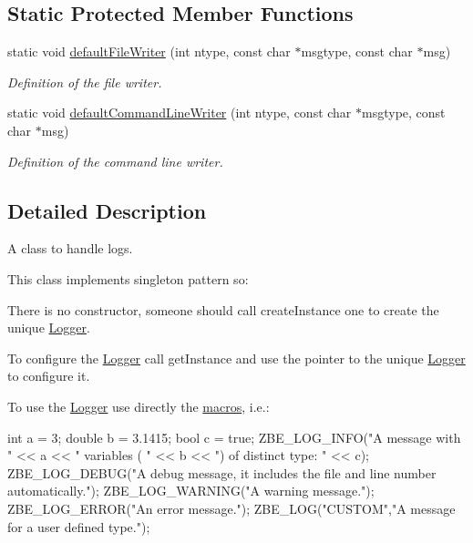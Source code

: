 \subsection*{Static Protected Member Functions}
\begin{DoxyCompactItemize}
\item 
static void \hyperlink{classzbe_1_1_logger_ac372e274976a42dd44d2109a6985b8d3}{default\+File\+Writer} (int ntype, const char $\ast$msgtype, const char $\ast$msg)
\begin{DoxyCompactList}\small\item\em Definition of the file writer. \end{DoxyCompactList}\item 
static void \hyperlink{classzbe_1_1_logger_a3e0850e34cc6abec6ffc5f4b08043d4a}{default\+Command\+Line\+Writer} (int ntype, const char $\ast$msgtype, const char $\ast$msg)
\begin{DoxyCompactList}\small\item\em Definition of the command line writer. \end{DoxyCompactList}\end{DoxyCompactItemize}


\subsection{Detailed Description}
A class to handle logs. 

This class implements singleton pattern so\+:


\begin{DoxyItemize}
\item There is no constructor, someone should call create\+Instance one to create the unique \hyperlink{classzbe_1_1_logger}{Logger}.
\item To configure the \hyperlink{classzbe_1_1_logger}{Logger} call get\+Instance and use the pointer to the unique \hyperlink{classzbe_1_1_logger}{Logger} to configure it.
\item To use the \hyperlink{classzbe_1_1_logger}{Logger} use directly the \hyperlink{_logger_8h}{macros}, i.\+e.\+: \begin{DoxyVerb}int a = 3;
double b = 3.1415;
bool c = true;
ZBE_LOG_INFO("A message with " << a << " variables ( " << b << ") of distinct type: " << c);
ZBE_LOG_DEBUG("A debug message, it includes the file and line number automatically.");
ZBE_LOG_WARNING("A warning message.");
ZBE_LOG_ERROR("An error message.");
ZBE_LOG("CUSTOM","A message for a user defined type.");
\end{DoxyVerb}

\end{DoxyItemize}

